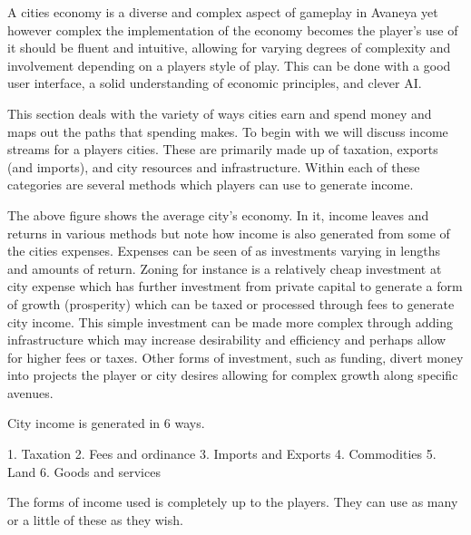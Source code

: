 


A cities economy is a diverse and complex aspect of gameplay in Avaneya yet however complex the implementation of the economy becomes the player's use of it should be fluent and intuitive, allowing for varying degrees of complexity and involvement depending on a players style of play. This can be done with a good user interface, a solid understanding of economic principles, and clever AI. 

This section deals with the variety of ways cities earn and spend money and maps out the paths that spending makes. To begin with we will discuss income streams for a players cities. These are primarily made up of taxation, exports (and imports), and city resources and infrastructure. Within each of these categories are several methods which players can use to generate income.

The above figure shows the average city's economy. In it, income leaves and returns in various methods but note how income is also generated from some of the cities expenses. Expenses can be seen of as investments varying in lengths and amounts of return. Zoning for instance is a relatively cheap investment at city expense which has further investment from private capital to generate a form of growth (prosperity) which can be taxed or processed through fees to generate city income. This simple investment can be made more complex through adding infrastructure which may increase desirability and efficiency and perhaps allow for higher fees or taxes. Other forms of investment, such as funding, divert money into projects the player or city desires allowing for complex growth along specific avenues.




City income is generated in 6 ways.

1.  Taxation
2.  Fees and ordinance
3.  Imports and Exports
4.  Commodities
5.  Land
6.  Goods and services

The forms of income used is completely up to the players. They can use as many or a little of these as they wish.



